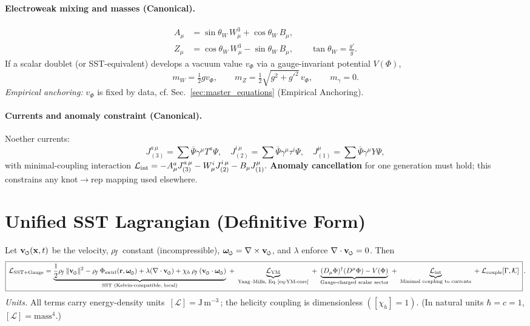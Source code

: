 \documentclass[11pt]{article}
\begin{document}
\paragraph{Electroweak mixing and masses (Canonical).}
\begin{align}
	A_\mu &= \sin\theta_W\, W^3_\mu + \cos\theta_W\, B_\mu,\label{eq:photon}\\
	Z_\mu &= \cos\theta_W\, W^3_\mu - \sin\theta_W\, B_\mu,\qquad \tan\theta_W=\frac{g'}{g}.
\end{align}
If a scalar doublet (or SST-equivalent) develops a vacuum value $v_\Phi$ via a gauge-invariant potential $V(\Phi)$,
\begin{equation}
	m_W = \tfrac{1}{2} g v_\Phi,\qquad
	m_Z = \tfrac{1}{2}\sqrt{g^2+g'^2}\,v_\Phi,\qquad
	m_\gamma=0. \label{eq:ew_masses}
\end{equation}
\textit{Empirical anchoring:} $v_\Phi$ is fixed by data, cf. Sec.~\ref{sec:master_equations} (Empirical Anchoring).

\paragraph{Currents and anomaly constraint (Canonical).}
Noether currents:
\[
	J^{a\,\mu}_{(3)}=\sum \bar{\Psi}\gamma^\mu T^a\Psi,\quad
	J^{i\,\mu}_{(2)}=\sum \bar{\Psi}\gamma^\mu \tau^i\Psi,\quad
	J^\mu_{(1)}=\sum \bar{\Psi}\gamma^\mu Y\Psi,
\]
with minimal-coupling interaction
\(
\mathcal L_{\rm int}=- A^a_\mu J^{a\,\mu}_{(3)} - W^i_\mu J^{i\,\mu}_{(2)} - B_\mu J^\mu_{(1)}.
\)
\textbf{Anomaly cancellation} for one generation must hold; this constrains any knot\(\to\)rep mapping used elsewhere.


\section{Unified SST Lagrangian (Definitive Form)}
\label{sec:lagrangian}
Let $\vswirl(\mathbf{x},t)$ be the velocity, $\rho_{\!f}$ constant (incompressible),
$\omegas = \nabla\times\vswirl$, and $\lambda$ enforce $\nabla\cdot\vswirl=0$. Then
\[
	\boxed{\,\mathcal{L}_{\text{SST+Gauge}}
		=
		\underbrace{\frac{1}{2}\rhof\,\|\vswirl\|^2
		- \rhof\,\Phi_{\text{swirl}}(\mathbf{r},\omegas)
			+ \lambda(\nabla\cdot\vswirl)
			+ \chi_h\,\rhof\,(\vswirl\cdot\omegas)}_{\text{SST (Kelvin-compatible, local)}}
		\;+\;
		\underbrace{\mathcal{L}_{\text{YM}}}_{\text{Yang--Mills, Eq.\,\eqref{eq:YM-core}}}
		\;+\;
		\underbrace{(D_\mu\Phi)^\dagger (D^\mu\Phi) - V(\Phi)}_{\text{Gauge-charged scalar sector}}
		\;+\;
		\underbrace{\mathcal{L}_{\text{int}}}_{\text{Minimal coupling to currents}}
		\;+\;
		\mathcal{L}_{\text{couple}}[\Gamma,\mathcal{K}]
		\,}\,.
\]
\noindent\emph{Units.} All terms carry energy-density units $\,[\mathcal L]=\mathrm{J\,m^{-3}}\,$; the helicity coupling is dimensionless $([\chi_h]=1)$. (In natural units $\hbar=c=1$, $[\mathcal L]=\text{mass}^4$.)
\end{document}
